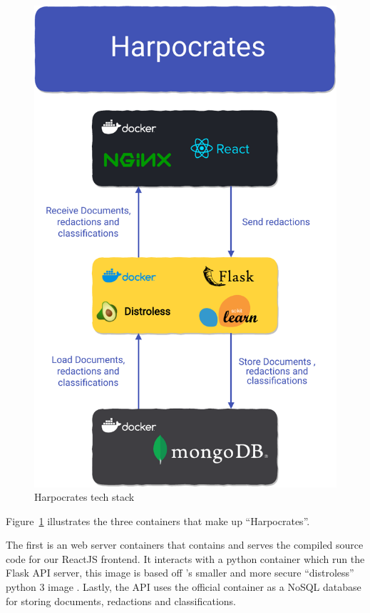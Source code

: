 \documentclass[\version]{l4proj}
\begin{document}
\begin{figure}
    \includegraphics[width=\linewidth]{figures/tech_stack_no_background.pdf}
    \caption{Harpocrates tech stack}\label{fig:tech_stack}
    \vspace{-50pt}
\end{figure}

Figure~\ref{fig:tech_stack} illustrates the three containers that make up ``Harpocrates''.

The first is an \textcite{NGINX2020} web server containers that contains and serves the compiled source code for our ReactJS frontend.
It interacts with a python container which run the Flask API server, this image is based off \textcite{GoogleContainerToolsDistroless2020}'s smaller and more secure ``distroless'' python 3 image \autocite{mooreDistrolessDockerContainerizing2017}.
Lastly, the API uses the official \textcite{MongoDB2020} container as a NoSQL database for storing documents, redactions and classifications.
\end{document}
